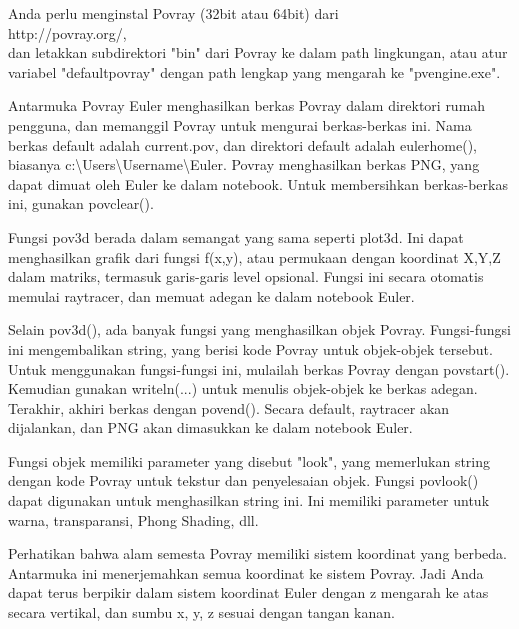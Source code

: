 \documentclass{article}
\begin{document}
\begin{eulernotebook}
\begin{eulercomment}
Anda perlu menginstal Povray (32bit atau 64bit) dari \\
http://povray.org/, \\
dan letakkan subdirektori "bin" dari Povray ke dalam path lingkungan,
atau atur variabel "defaultpovray" dengan path lengkap yang mengarah
ke "pvengine.exe".

Antarmuka Povray Euler menghasilkan berkas Povray dalam direktori
rumah pengguna, dan memanggil Povray untuk mengurai berkas-berkas ini.
Nama berkas default adalah current.pov, dan direktori default adalah
eulerhome(), biasanya c:\textbackslash{}Users\textbackslash{}Username\textbackslash{}Euler. Povray menghasilkan
berkas PNG, yang dapat dimuat oleh Euler ke dalam notebook. Untuk
membersihkan berkas-berkas ini, gunakan povclear().

Fungsi pov3d berada dalam semangat yang sama seperti plot3d. Ini dapat
menghasilkan grafik dari fungsi f(x,y), atau permukaan dengan
koordinat X,Y,Z dalam matriks, termasuk garis-garis level opsional.
Fungsi ini secara otomatis memulai raytracer, dan memuat adegan ke
dalam notebook Euler.

Selain pov3d(), ada banyak fungsi yang menghasilkan objek Povray.
Fungsi-fungsi ini mengembalikan string, yang berisi kode Povray untuk
objek-objek tersebut. Untuk menggunakan fungsi-fungsi ini, mulailah
berkas Povray dengan povstart(). Kemudian gunakan writeln(...) untuk
menulis objek-objek ke berkas adegan. Terakhir, akhiri berkas dengan
povend(). Secara default, raytracer akan dijalankan, dan PNG akan
dimasukkan ke dalam notebook Euler.

Fungsi objek memiliki parameter yang disebut "look", yang memerlukan
string dengan kode Povray untuk tekstur dan penyelesaian objek. Fungsi
povlook() dapat digunakan untuk menghasilkan string ini. Ini memiliki
parameter untuk warna, transparansi, Phong Shading, dll.

Perhatikan bahwa alam semesta Povray memiliki sistem koordinat yang
berbeda. Antarmuka ini menerjemahkan semua koordinat ke sistem Povray.
Jadi Anda dapat terus berpikir dalam sistem koordinat Euler dengan z
mengarah ke atas secara vertikal, dan sumbu x, y, z sesuai dengan
tangan kanan.


\end{eulercomment}
\end{eulernotebook}
\end{document}

